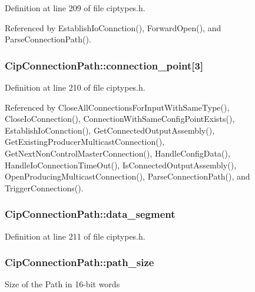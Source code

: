 \-Definition at line 209 of file ciptypes.\-h.



\-Referenced by \-Establish\-Io\-Connction(), \-Forward\-Open(), and \-Parse\-Connection\-Path().

\hypertarget{structCipConnectionPath_a4f909044fc44d1e1028c105f045aca1d}{
\subsubsection[{connection\-\_\-point}]{ {\bf \-Cip\-Connection\-Path\-::connection\-\_\-point}\mbox{[}3\mbox{]}}}\label{dd/d06/structCipConnectionPath_a4f909044fc44d1e1028c105f045aca1d}


\-Definition at line 210 of file ciptypes.\-h.



\-Referenced by \-Close\-All\-Connections\-For\-Input\-With\-Same\-Type(), \-Close\-Io\-Connection(), \-Connection\-With\-Same\-Config\-Point\-Exists(), \-Establish\-Io\-Connction(), \-Get\-Connected\-Output\-Assembly(), \-Get\-Existing\-Producer\-Multicast\-Connection(), \-Get\-Next\-Non\-Control\-Master\-Connection(), \-Handle\-Config\-Data(), \-Handle\-Io\-Connection\-Time\-Out(), \-Is\-Connected\-Output\-Assembly(), \-Open\-Producing\-Multicast\-Connection(), \-Parse\-Connection\-Path(), and \-Trigger\-Connections().

\hypertarget{structCipConnectionPath_ad67cf3370c00161393ded7f91a0b690f}{
\subsubsection[{data\-\_\-segment}]{ {\bf \-Cip\-Connection\-Path\-::data\-\_\-segment}}}\label{dd/d06/structCipConnectionPath_ad67cf3370c00161393ded7f91a0b690f}


\-Definition at line 211 of file ciptypes.\-h.

\hypertarget{structCipConnectionPath_a2647aaa699156b7ef9a0394f3abe27c2}{
\subsubsection[{path\-\_\-size}]{ {\bf \-Cip\-Connection\-Path\-::path\-\_\-size}}}\label{dd/d06/structCipConnectionPath_a2647aaa699156b7ef9a0394f3abe27c2}
\-Size of the \-Path in 16-\/bit words 

